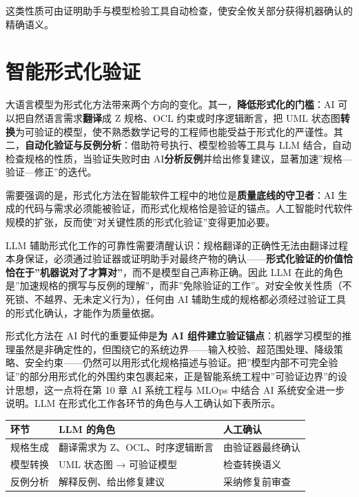 \documentclass[
]{ctexbook}
\newcounter{none}
\begin{document}
这类性质可由证明助手与模型检验工具自动检查，使安全攸关部分获得机器确认的精确语义。

\section{智能形式化验证}\label{ux667aux80fdux5f62ux5f0fux5316ux9a8cux8bc1}

大语言模型为形式化方法带来两个方向的变化。其一，\textbf{降低形式化的门槛}：AI
可以把自然语言需求\textbf{翻译}成 Z 规格、OCL 约束或时序逻辑断言，把 UML
状态图\textbf{转换}为可验证的模型，使不熟悉数学记号的工程师也能受益于形式化的严谨性。其二，\textbf{自动化验证与反例分析}：借助符号执行、模型检验等工具与
LLM 结合，自动检查规格的性质，当验证失败时由
AI\textbf{分析反例}并给出修复建议，显著加速''规格---验证---修正''的迭代。

需要强调的是，形式化方法在智能软件工程中的地位是\textbf{质量底线的守卫者}：AI
生成的代码与需求必须能被验证，而形式化规格恰是验证的锚点。人工智能时代软件规模的扩张，反而使''对关键性质的形式化验证''变得更加必要。

LLM
辅助形式化工作的可靠性需要清醒认识：规格翻译的正确性无法由翻译过程本身保证，必须通过验证器或证明助手对最终产物的确认------\textbf{形式化验证的价值恰恰在于''机器说对了才算对''}，而不是模型自己声称正确。因此
LLM
在此的角色是''加速规格的撰写与反例的理解''，而非''免除验证的工作''。对安全攸关性质（不死锁、不越界、无未定义行为），任何由
AI 辅助生成的规格都必须经过验证工具的形式化确认，才能作为质量依据。

形式化方法在 AI 时代的重要延伸是\textbf{为 AI
组件建立验证锚点}：机器学习模型的推理虽然是非确定性的，但围绕它的系统边界------输入校验、超范围处理、降级策略、安全约束------仍然可以用形式化规格描述与验证。把''模型内部不可完全验证''的部分用形式化的外围约束包裹起来，正是智能系统工程中''可验证边界''的设计思想，这一点将在第
10 章 AI 系统工程与 MLOps 中结合 AI 系统安全进一步说明。LLM
在形式化工作各环节的角色与人工确认如下表所示。

{\def\LTcaptype{none} %
\begin{longtable}[]{@{}lll@{}}
\toprule\noalign{}
环节 & LLM 的角色 & 人工确认 \\
\midrule\noalign{}
\endhead
\bottomrule\noalign{}
\endlastfoot
规格生成 & 翻译需求为 Z、OCL、时序逻辑断言 & 由验证器最终确认 \\
模型转换 & UML 状态图 → 可验证模型 & 检查转换语义 \\
反例分析 & 解释反例、给出修复建议 & 采纳修复前审查 \\
\end{longtable}
}
\end{document}
